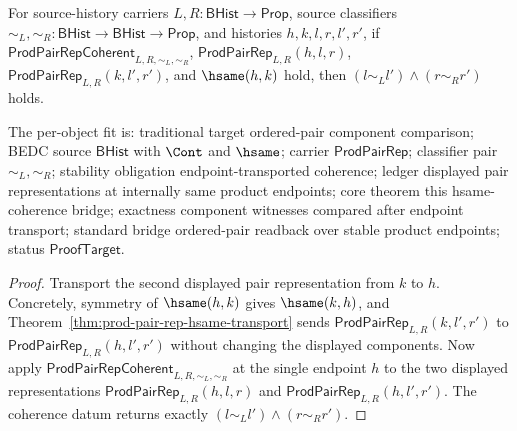\begin{theorem}
\label{thm:prod-pair-rep-hsame-coherence}
For source-history carriers $L,R:\mathsf{BHist}\to\mathsf{Prop}$, source
classifiers $\sim_L,\sim_R:\mathsf{BHist}\to\mathsf{BHist}\to\mathsf{Prop}$,
and histories $h,k,l,r,l',r'$, if
$\mathsf{ProdPairRepCoherent}_{L,R,\sim_L,\sim_R}$,
$\mathsf{ProdPairRep}_{L,R}(h,l,r)$,
$\mathsf{ProdPairRep}_{L,R}(k,l',r')$, and $\hsame(h,k)$ hold, then
$(l\sim_L l')\wedge(r\sim_R r')$ holds.

The per-object fit is: traditional target ordered-pair component comparison;
BEDC source $\mathsf{BHist}$ with $\Cont$ and $\hsame$; carrier
$\mathsf{ProdPairRep}$; classifier pair $\sim_L,\sim_R$; stability obligation
endpoint-transported coherence; ledger displayed pair representations at
internally same product endpoints; core theorem this hsame-coherence bridge;
exactness component witnesses compared after endpoint transport; standard bridge
ordered-pair readback over stable product endpoints; status
$\mathsf{ProofTarget}$.
\end{theorem}
\begin{proof}
Transport the second displayed pair representation from $k$ to $h$. Concretely,
symmetry of $\hsame(h,k)$ gives $\hsame(k,h)$, and
Theorem~\ref{thm:prod-pair-rep-hsame-transport} sends
$\mathsf{ProdPairRep}_{L,R}(k,l',r')$ to
$\mathsf{ProdPairRep}_{L,R}(h,l',r')$ without changing the displayed components.
Now apply $\mathsf{ProdPairRepCoherent}_{L,R,\sim_L,\sim_R}$ at the single
endpoint $h$ to the two displayed representations
$\mathsf{ProdPairRep}_{L,R}(h,l,r)$ and
$\mathsf{ProdPairRep}_{L,R}(h,l',r')$. The coherence datum returns exactly
$(l\sim_L l')\wedge(r\sim_R r')$.
\end{proof}

